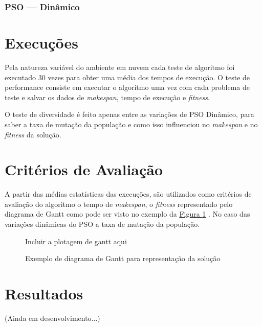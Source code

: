         \subsubsection{PSO — Dinâmico}

    



\section{Execuções}
    Pela natureza variável do ambiente em nuvem cada teste de algoritmo foi executado 30 vezes para obter uma média dos tempos de execução. O teste de performance consiste em executar o algoritmo uma vez com cada problema de teste e salvar os dados de \textit{makespan}, tempo de execução e \textit{fitness}.

    O teste de diversidade é feito apenas entre as variações de PSO Dinâmico, para saber a taxa de mutação da população e como isso influenciou no \textit{makespan} e no \textit{fitness} da solução.


\section{Critérios de Avaliação}
    A partir das médias estatísticas das execuções, são utilizados como critérios de avaliação do algoritmo o tempo de \textit{makespan}, o \textit{fitness} representado pelo diagrama de Gantt como pode ser visto no exemplo da 
    \hyperref[fig:exemplo-gantt]{Figura \ref{fig:exemplo-gantt}}
    . No caso das variações dinâmicas do PSO a taxa de mutação da população.

    \begin{figure}[h]
        \centering
        \small{Incluir a plotagem de gantt aqui}
        \caption{Exemplo de diagrama de Gantt para representação da solução}
        \label{fig:exemplo-gantt}
    \end{figure}
    


\section{Resultados}
    (Ainda em desenvolvimento...)


